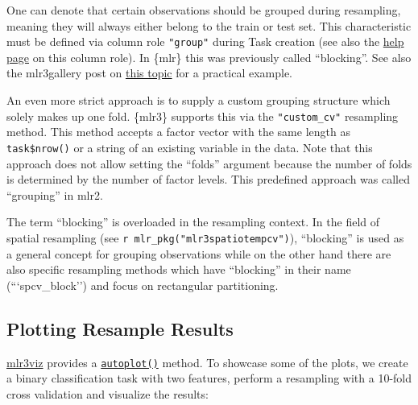 \documentclass[
]{scrbook}
\makeatletter
\newenvironment{kframe}{%
\medskip{}
\setlength{\fboxsep}{.8em}
 \def\at@end@of@kframe{}%
 \ifinner\ifhmode%
  \def\at@end@of@kframe{\end{minipage}}%
  \begin{minipage}{\columnwidth}%
 \fi\fi%
 \def\FrameCommand##1{\hskip\@totalleftmargin \hskip-\fboxsep
 \colorbox{shadecolor}{##1}\hskip-\fboxsep
     \hskip-\linewidth \hskip-\@totalleftmargin \hskip\columnwidth}%
 \MakeFramed {\advance\hsize-\width
   \@totalleftmargin\z@ \linewidth\hsize
   \@setminipage}}%
 {\par\unskip\endMakeFramed%
 \at@end@of@kframe}
\newenvironment{rmdblock}[1]
  {
  \begin{itemize}
  \renewcommand{\labelitemi}{
    \raisebox{-.7\height}[0pt][0pt]{
      {\setkeys{Gin}{width=3em,keepaspectratio}\texttt{[image: images/\#1]}}
    }
  }
  \setlength{\fboxsep}{1em}
  \begin{kframe}
  \item
  }
  {
  \end{kframe}
  \end{itemize}
  }
\newenvironment{rmdcaution}
  {\begin{rmdblock}{caution}}
  {\end{rmdblock}}
\makeatother
\begin{document}
One can denote that certain observations should be grouped during resampling, meaning they will always either belong to the train or test set.
This characteristic must be defined via column role \texttt{"group"} during Task creation (see also the \href{https://mlr3.mlr-org.com/reference/Resampling.html\#grouping-blocking}{help page} on this column role).
In \{mlr\} this was previously called ``blocking''.
See also the mlr3gallery post on \href{https://mlr3gallery.mlr-org.com/posts/2020-03-30-stratification-blocking/}{this topic} for a practical example.

An even more strict approach is to supply a custom grouping structure which solely makes up one fold.
\{mlr3\} supports this via the \texttt{"custom\_cv"} resampling method.
This method accepts a factor vector with the same length as \texttt{task\$nrow()} or a string of an existing variable in the data.
Note that this approach does not allow setting the ``folds'' argument because the number of folds is determined by the number of factor levels.
This predefined approach was called ``grouping'' in mlr2.

\begin{rmdcaution}
The term ``blocking'' is overloaded in the resampling context. In the
field of spatial resampling (see
\texttt{r\ mlr\_pkg("mlr3spatiotempcv")}), ``blocking'' is used as a
general concept for grouping observations while on the other hand there
are also specific resampling methods which have ``blocking'' in their
name (```spcv\_block'') and focus on rectangular partitioning.
\end{rmdcaution}

\hypertarget{autoplot-resampleresult}{%
\subsection{Plotting Resample Results}\label{autoplot-resampleresult}}

\href{https://mlr3viz.mlr-org.com}{mlr3viz} provides a \href{https://www.rdocumentation.org/packages/ggplot2/topics/autoplot}{\texttt{autoplot()}} method.
To showcase some of the plots, we create a binary classification task with two features, perform a resampling with a 10-fold cross validation and visualize the results:
\end{document}
